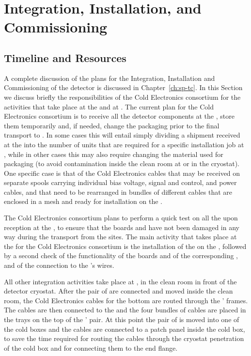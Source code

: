 \section{Integration, Installation, and Commissioning}
\label{sec:fdsp-tpcelec-integration}

\subsection{Timeline and Resources}
\label{sec:fdsp-tpcelec-integration-timeline}

A complete discussion of the plans for the Integration, Installation
and Commissioning of the detector is discussed in Chapter~\ref{ch:sp-tc}.
In this Section we discuss briefly the responsibilities of the Cold
Electronics consortium for the activities that take place at the
 and at \surf. The current plan for the Cold Electronics
consortium is to receive all the detector components at the ,
store them temporarily and, if needed, change the packaging prior to
the final transport to \surf. In some cases this will entail simply
dividing a shipment received at the  into the number of
units that are required for a specific installation job at \surf,
while in other cases this may also require changing the material
used for packaging (to avoid contamination inside the clean room
at \surf or in the cryostat). One specific case is that of the Cold
Electronics cables that may be received on separate spools carrying 
individual bias voltage, signal and control, and power cables, and that 
need to be rearranged in bundles of different cables that are enclosed
in a mesh and ready for installation on the . 

The Cold Electronics consortium plans to perform a quick test on all
the  upon reception at the , to ensure that
the boards and  have not been damaged in any way during the transport 
from the   sites. The main activity that takes 
place at the  for the Cold Electronics consortium is the 
installation of the  on the , followed by 
a second check of the functionality of the boards and of the 
corresponding , and of the connection to the 
's wires. 

All other integration activities take place at \surf, in the clean room
in front of the detector cryostat. After the pair of  are 
connected and moved inside the clean room, the Cold Electronics cables
for the bottom  are routed through the ' frames.
The cables are then connected to the  and the four bundles
of cables are placed in the trays on the top of the ' pair.
At this point the pair of  is moved into one of the cold
boxes and the cables are connected to a patch panel inside the cold box,
to save the time required for routing the cables through the cryostat
penetration of the cold box and for connecting them to the end flange.

